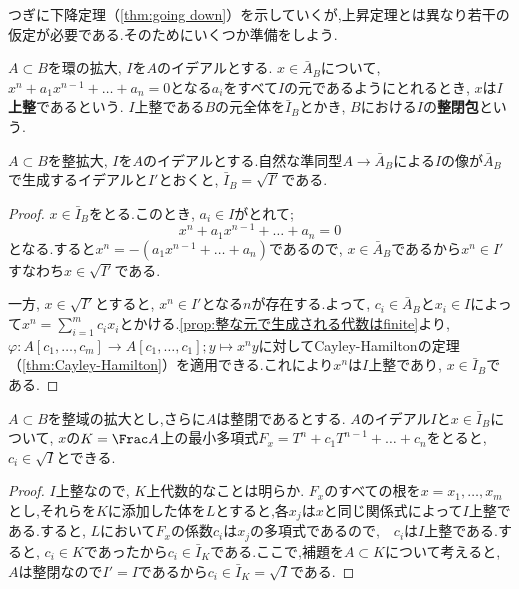つぎに下降定理（\ref{thm:going down}）を示していくが,上昇定理とは異なり若干の仮定が必要である.そのためにいくつか準備をしよう.

\begin{defi}
	$A\subset B$を環の拡大, $I$を$A$のイデアルとする. $x\in\bar{A}_B$について, $x^n+a_1x^{n-1}+\dots+a_n=0$となる$a_i$をすべて$I$の元であるようにとれるとき, $x$は$I$\textbf{上整}であるという. $I$上整である$B$の元全体を$\bar{I}_B$とかき, $B$における$I$の\textbf{整閉包}という. 
\end{defi}

\begin{lem}\label{lem:イデアルの整閉包と根基}
	$A\subset B$を整拡大, $I$を$A$のイデアルとする.自然な準同型$A\to \bar{A}_B$による$I$の像が$\bar{A}_B$で生成するイデアルと$I'$とおくと, $\bar{I}_B=\sqrt{I'}$である.
\end{lem}

\begin{proof}
	$x\in\bar{I}_B$をとる.このとき, $a_i\in I$がとれて;
	\[x^n+a_1x^{n-1}+\dots+a_n=0\]
	となる.すると$x^n=-(a_1x^{n-1}+\dots+a_n)$であるので, $x\in\bar{A}_B$であるから$x^n\in I'$すなわち$x\in\sqrt{I'}$である.
	
	一方, $x\in\sqrt{I'}$とすると, $x^n\in I'$となる$n$が存在する.よって, $c_i\in\bar{A}_B$と$x_i\in I$によって$x^n=\sum_{i=1}^m c_ix_i$とかける.\ref{prop:整な元で生成される代数はfinite}より, $\varphi:A[c_1,\dots,c_m]\to A[c_1,\dots,c_1];y\mapsto x^ny$に対してCayley-Hamiltonの定理（\ref{thm:Cayley-Hamilton}）を適用できる.これにより$x^n$は$I$上整であり, $x\in\bar{I}_B$である.
\end{proof}

\begin{prop}\label{prop:整なら最小多項式が根基からとれる}
	$A\subset B$を整域の拡大とし,さらに$A$は整閉であるとする. $A$のイデアル$I$と$x\in\bar{I}_B$について, $x$の$K=\Frac A$上の最小多項式$F_x=T^n+c_1T^{n-1}+\dots+c_n$をとると, $c_i\in\sqrt{I}$とできる.
\end{prop}

\begin{proof}
	$I$上整なので, $K$上代数的なことは明らか. $F_x$のすべての根を$x=x_1,\dots,x_m$とし,それらを$K$に添加した体を$L$とすると,各$x_j$は$x$と同じ関係式によって$I$上整である.すると, $L$において$F_x$の係数$c_i$は$x_j$の多項式であるので,　$c_i$は$I$上整である.すると, $c_i\in K$であったから$c_i\in\bar{I}_K$である.ここで,補題を$A\subset K$について考えると, $A$は整閉なので$I'=I$であるから$c_i\in\bar{I}_K=\sqrt{I}$である.
\end{proof}

